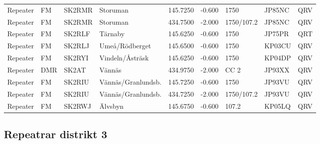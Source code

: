 \begin{longtable}{llllrrlll}
Repeater   & FM          & SK2RMR    & Storuman           & 145.7250     & -0.600     & 1750       & JP85NC      & QRV      \\
Repeater   & FM          & SK2RMR    & Storuman           & 434.7500     & -2.000     & 1750/107.2 & JP85NC      & QRV      \\
Repeater   & FM          & SK2RLF    & Tärnaby            & 145.6250     & -0.600     & 1750       & JP75PR      & QRT      \\
Repeater   & FM          & SK2RLJ    & Umeå/Rödberget     & 145.6500     & -0.600     & 1750       & KP03CU      & QRV      \\
Repeater   & FM          & SK2RYI    & Vindeln/Åsträsk    & 145.6250     & -0.600     & 1750       & KP04DP      & QRV      \\
Repeater   & DMR         & SK2AT     & Vännäs             & 434.9750     & -2.000     & CC 2       & JP93XX      & QRV      \\
Repeater   & FM          & SK2RIU    & Vännäs/Granlundsb. & 145.7250     & -0.600     & 1750       & JP93VU      & QRV      \\
Repeater   & FM          & SK2RIU    & Vännäs/Granlundsb. & 434.7250     & -2.000     & 1750/107.2 & JP93VU      & QRV      \\
Repeater   & FM          & SK2RWJ    & Älvsbyn            & 145.6750     & -0.600     & 107.2      & KP05LQ      & QRV      \\
\end{longtable}

\normalsize

\clearpage

\subsection{Repeatrar distrikt 3}

\scriptsize

